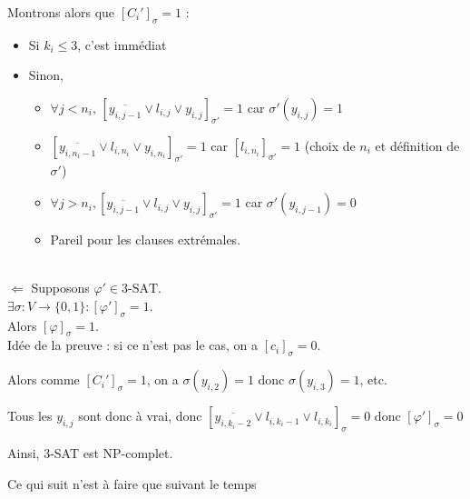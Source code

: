 \begin{enumerate}
	Montrons alors que $[C_i']_\sigma = 1$ : \begin{itemize}[label = $\star$]
		\item Si $k_i \leq 3$, c'est immédiat
		\item Sinon, \begin{itemize}[label=$\bullet$]
			\item $\forall j < n_i, \, \left[ \overline{y_{i, j-1}} \vee l_{i,j} \vee y_{i,j} \right]_{\sigma'} = 1$ car $\sigma'(y_{i,j}) = 1$
			\item $\left[ \overline{y_{i, n_i-1}} \vee l_{i,n_i} \vee y_{i,n_i} \right]_{\sigma'} = 1$ car $ \left[ l_{i,n_i} \right]_{\sigma'} = 1$ (choix de $n_i$ et définition de $\sigma'$)
			\item $\forall j > n_i, \left[ \overline{y_{i, j-1}} \vee l_{i,j} \vee y_{i,j} \right]_{\sigma'} = 1$ car $\sigma'(y_{i, j-1}) = 0$ 
			\item Pareil pour les clauses extrémales.
		\end{itemize}
	\end{itemize}\enspace \\
	
	$\boxed{\Leftarrow}$ Supposons $\varphi' \in \text{3-SAT}$.\\
	
	$\exists \sigma : V \to \{0,1\} : [\varphi']_\sigma = 1$.\\
	Alors $[\varphi]_\sigma = 1$.\\
	\hspace*{1cm}Idée de la preuve : si ce n'est pas le cas, on a $[c_i]_\sigma = 0$.
	
	\hspace*{1cm}Alors comme $[C_i']_\sigma = 1$, on a $\sigma(y_{i, 2}) = 1$ donc $\sigma(y_{i, 3}) = 1$, etc.
	
	\hspace*{1cm}Tous les $y_{i,j}$ sont donc à vrai, donc $\left[\overline{y_{i, k_i-2}} \vee l_{i, k_i-1} \vee l_{i, k_i}\right]_\sigma = 0 $ donc $\left[\varphi'\right]_\sigma = 0$

\end{enumerate}

Ainsi, 3-SAT est NP-complet.

\begin{com}
	Ce qui suit n'est à faire que suivant le temps
\end{com}

